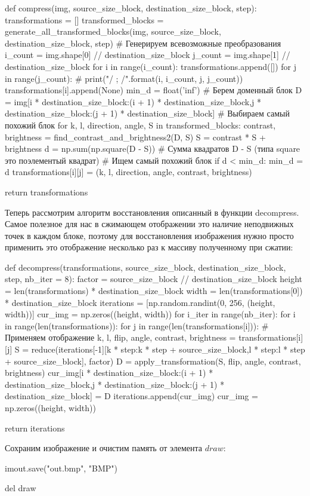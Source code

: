 \documentclass{article}
\begin{document}
{
def compress(img, source_size_block, destination_size_block, step):
	transformations = []
	transformed_blocks = generate_all_transformed_blocks(img, source_size_block, destination_size_block, step) # Генерируем всевозможные преобразования
	i_count = img.shape[0] // destination_size_block
	j_count = img.shape[1] // destination_size_block
	for i in range(i_count):
		transformations.append([])
		for j in range(j_count):
			# print("{}/{} ; {}/{}".format(i, i_count, j, j_count))
			transformations[i].append(None)
			min_d = float('inf')
			# Берем доменный блок
			D = img[i * destination_size_block:(i + 1) * destination_size_block,j * destination_size_block:(j + 1) * destination_size_block]
			# Выбираем самый похожий блок
			for k, l, direction, angle, S in transformed_blocks:
				contrast, brightness = find_contrast_and_brightness2(D, S)
				S = contrast * S + brightness
				d = np.sum(np.square(D - S)) # Сумма квадратов D - S (типа square это поэлементый квадрат)
				# Ищем самый похожий блок
				if d < min_d:
					min_d = d
					transformations[i][j] = (k, l, direction, angle, contrast, brightness)

	return transformations
}
\vspace{1em}

Теперь рассмотрим алгоритм восстановления описанный в функции decompress. Самое полезное для нас в сжимающем отображении это наличие неподвижных точек в каждом блоке, поэтому для восстановления изображения 
нужно просто применить это отображение несколько раз к массиву полученному при сжатии:

{
def decompress(transformations, source_size_block, destination_size_block, step, nb_iter = 8):
	factor = source_size_block // destination_size_block
	height = len(transformations) * destination_size_block
	width = len(transformations[0]) * destination_size_block
	iterations = [np.random.randint(0, 256, (height, width))]
	cur_img = np.zeros((height, width))
	for i_iter in range(nb_iter):
		for i in range(len(transformations)):
			for j in range(len(transformations[i])):
				# Применяем отображение
				k, l, flip, angle, contrast, brightness = transformations[i][j]
				S = reduce(iterations[-1][k * step:k * step + source_size_block,l * step:l * step + source_size_block], factor)
				D = apply_transformation(S, flip, angle, contrast, brightness)
				cur_img[i * destination_size_block:(i + 1) * destination_size_block,j * destination_size_block:(j + 1) * destination_size_block] = D
		iterations.append(cur_img)
		cur_img = np.zeros((height, width))

	return iterations
}
\vspace{1em}


Сохраним изображение и очистим память от элемента $draw$:
\vspace{1em}
	
{

imout.save("out.bmp", "BMP")

del draw
}
  
\end{document}
